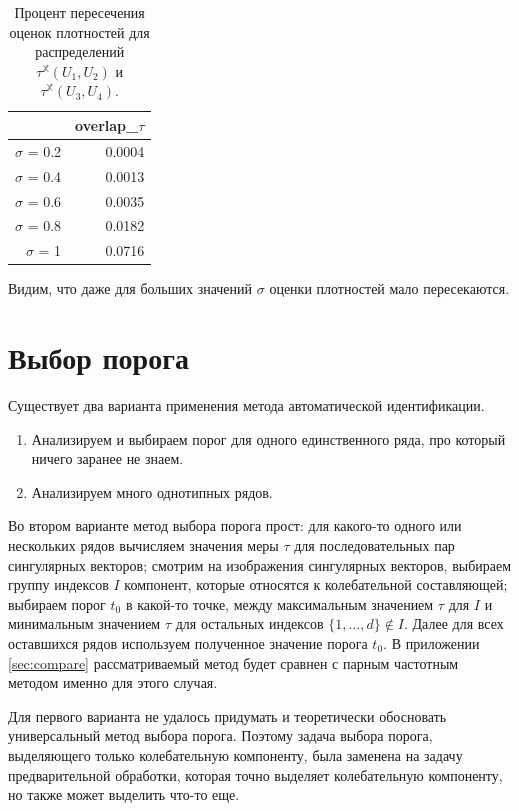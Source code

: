 \documentclass[specialist,
               substylefile = spbu.rtx,
               subf,href,colorlinks=true, 12pt]{disser}
\begin{document}
\begin{table}[hhh!]
\caption{Процент пересечения оценок плотностей для распределений $\tau^{\mathbb{X}}(U_1, U_2)$ и $\tau^{\mathbb{X}}(U_3, U_4)$.}
\centering
\begin{tabular}{rr}
  \hline
 & overlap\_$\tau$ \\
  \hline
$\sigma$ = 0.2 & 0.0004 \\
  $\sigma$ = 0.4 & 0.0013 \\
  $\sigma$ = 0.6 & 0.0035 \\
  $\sigma$ = 0.8 & 0.0182 \\
  $\sigma$ = 1 & 0.0716 \\
   \hline
\end{tabular}
\label{tab:model_dist_tau1_overlap_sig_noise_notint}
\end{table}

Видим, что даже для больших значений $\sigma$ оценки плотностей мало пересекаются.

\section{Выбор порога}
\label{sec:treshold_selection}

Существует два варианта применения метода автоматической идентификации.

\begin{enumerate}
\item Анализируем и выбираем порог для одного единственного ряда, про который ничего заранее не знаем.
\item Анализируем много однотипных рядов.
\end{enumerate}

Во втором варианте метод выбора порога прост:
для какого-то одного или нескольких рядов вычисляем значения меры $\tau$ для последовательных пар сингулярных векторов;
смотрим на изображения сингулярных векторов, выбираем группу индексов $I$ компонент, которые относятся к колебательной составляющей; выбираем порог $t_0$ в какой-то точке, между максимальным значением $\tau$ для $I$ и минимальным значением $\tau$ для остальных индексов $\{1,\ldots,d\} \not \in I$. Далее для всех оставшихся рядов используем полученное значение порога $t_0$. В приложении \ref{sec:compare} рассматриваемый метод будет сравнен с парным частотным методом именно для этого случая. 

Для первого варианта не удалось придумать и теоретически обосновать универсальный метод выбора порога. Поэтому задача выбора порога, выделяющего только колебательную компоненту, была заменена на задачу предварительной обработки, которая точно выделяет колебательную компоненту, но также может выделить что-то еще.
\end{document}
